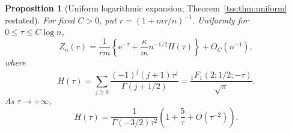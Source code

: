 \documentclass[11pt]{article}
\newtheorem{proposition}[theorem]{Proposition}
\theoremstyle{remark}\newtheorem{remark}[theorem]{Remark}
\theoremstyle{definition}\newtheorem{definition}[theorem]{Definition}
\newcommand{\e}{\mathrm e}
\begin{document}
\begin{proposition}[Uniform logarithmic expansion; Theorem~\ref{tss:thm:uniform} restated]\label{tss:cx:prop:uniform}
For fixed $C>0$, put $r=(1+m\tau/n)^{-1}$. Uniformly for
$0\le\tau\le C\log n$,
\begin{equation}\label{tss:cx:eq:uniform}
 Z_n(r)=\frac1{rm}
 \left\{\e^{-\tau}+\frac{\kappa}{m}n^{-1/2}H(\tau)\right\}
 +O_C(n^{-1}),
\end{equation}
where
\begin{equation}\label{tss:cx:eq:H}
 H(\tau)=\sum_{j\ge0}\frac{(-1)^j(j+1)\tau^j}{\Gamma(j+1/2)}
 =\frac{{}_1F_1(2;1/2;-\tau)}{\sqrt\pi}.
\end{equation}
As $\tau\to+\infty$,
\begin{equation}\label{tss:cx:eq:Hlarge}
 H(\tau)=\frac{1}{\Gamma(-3/2)\tau^2}
          \left(1+\frac5\tau+O(\tau^{-2})\right).
\end{equation}
\end{proposition}
\end{document}
